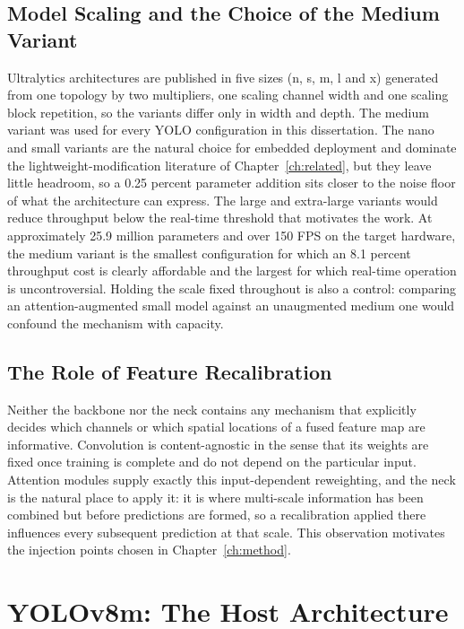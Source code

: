 \documentclass[MScCS]{uccthesis}
\begin{document}
\subsection{Model Scaling and the Choice of the Medium Variant}

Ultralytics architectures are published in five sizes (n, s, m, l and x)
generated from one topology by two multipliers, one scaling channel width and
one scaling block repetition, so the variants differ only in width and depth.
The medium variant was used for every YOLO configuration in this dissertation.
The nano and small variants are the natural choice for embedded deployment and
dominate the lightweight-modification literature of Chapter~\ref{ch:related},
but they leave little headroom, so a 0.25 percent parameter addition sits closer
to the noise floor of what the architecture can express. The large and
extra-large variants would reduce throughput below the real-time threshold that
motivates the work. At approximately 25.9 million parameters and over 150 FPS on
the target hardware, the medium variant is the smallest configuration for which
an 8.1 percent throughput cost is clearly affordable and the largest for which
real-time operation is uncontroversial. Holding the scale fixed throughout is
also a control: comparing an attention-augmented small model against an
unaugmented medium one would confound the mechanism with capacity.

\subsection{The Role of Feature Recalibration}

Neither the backbone nor the neck contains any mechanism that explicitly
decides which channels or which spatial locations of a fused feature map are
informative. Convolution is content-agnostic in the sense that its weights are
fixed once training is complete and do not depend on the particular input.
Attention modules supply exactly this input-dependent reweighting, and the
neck is the natural place to apply it: it is where multi-scale information has
been combined but before predictions are formed, so a recalibration applied
there influences every subsequent prediction at that scale. This observation
motivates the injection points chosen in Chapter~\ref{ch:method}.

\section{YOLOv8m: The Host Architecture}
\label{sec:yolov8m}
\end{document}
